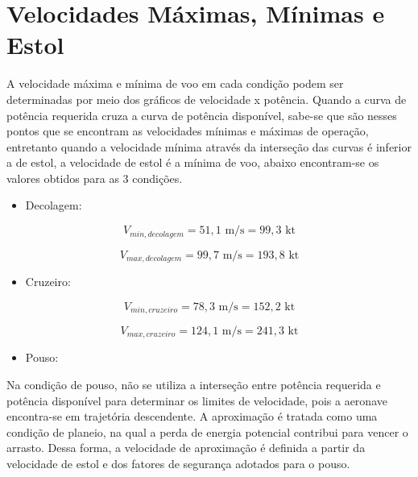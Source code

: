 \section{Velocidades Máximas, Mínimas e Estol}

A velocidade máxima e mínima de voo em cada condição podem ser determinadas por meio dos gráficos de velocidade x potência. Quando a curva de potência requerida cruza a curva de potência disponível, sabe-se que são nesses pontos que se encontram as velocidades mínimas e máximas de operação, entretanto quando a velocidade mínima através da interseção das curvas é inferior a de estol, a velocidade de estol é a mínima de voo, abaixo encontram-se os valores obtidos para as 3 condições.

\begin{itemize}
    \item{Decolagem:}
\end{itemize}

\begin{equation}
    V_{min,decolagem} = 51{,}1 \text{ m/s} = 99{,}3 \text{ kt}
\end{equation}

\begin{equation}
    V_{max,decolagem} = 99{,}7 \text{ m/s} = 193{,}8 \text{ kt}
\end{equation}


\begin{itemize}
    \item{Cruzeiro:}
\end{itemize}


\begin{equation}
    V_{min,cruzeiro} = 78{,}3 \text{ m/s} = 152{,}2 \text{ kt}
\end{equation}

\begin{equation}
    V_{max,cruzeiro} = 124{,}1 \text{ m/s} = 241{,}3 \text{ kt}
\end{equation}

\begin{itemize}
    \item Pouso:
\end{itemize}

Na condição de pouso, não se utiliza a interseção entre potência requerida e potência disponível para determinar os limites de velocidade, pois a aeronave encontra-se em trajetória descendente. A aproximação é tratada como uma condição de planeio, na qual a perda de energia potencial contribui para vencer o arrasto. Dessa forma, a velocidade de aproximação é definida a partir da velocidade de estol e dos fatores de segurança adotados para o pouso.


